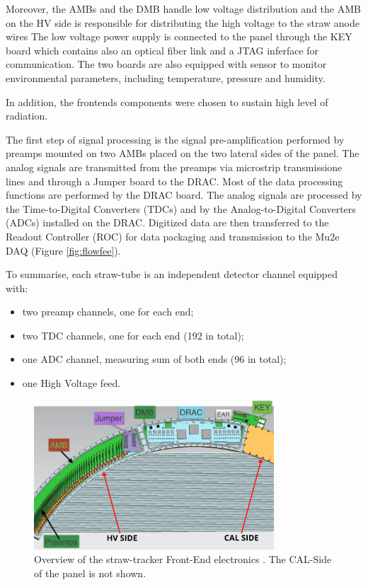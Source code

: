 Moreover, the AMBs and the DMB handle 
low voltage distribution and the AMB on the HV side is responsible for 
distributing the high voltage to the straw anode wires
The low voltage power supply is connected to the panel through the KEY board which 
contains also an optical fiber link and a JTAG inferface for communication.
The two boards are also equipped with sensor to monitor environmental parameters, 
including temperature, pressure and humidity.

In addition, the frontends components were chosen to sustain high level of radiation.

The first step of signal processing is the signal pre-amplification performed 
by preamps mounted on two AMBs placed on the two lateral sides of the panel. 
The analog signals are transmitted from the preamps via 
microstrip transmissione lines and through a Jumper board to the DRAC.
Most of the data processing functions are performed by the DRAC board. 
The analog signals are processed by the Time-to-Digital Converters 
(TDCs) and by the Analog-to-Digital Converters 
(ADCs) installed on the DRAC. Digitized data are then transferred to the Readout 
Controller (ROC) for data packaging and transmission to the Mu2e DAQ 
(Figure \ref{fig:flowfee}). 

To summarise, each straw-tube is an independent detector channel equipped with:
\begin{itemize}
    \item two preamp channels, one for each end;
    \item two TDC channels, one for each end (192 in total);
    \item one ADC channel, measuring sum of both ends (96 in total);
    \item one High Voltage feed.
\end{itemize}
\begin{figure}[!h]
\centering
\includegraphics[width =0.8\textwidth]{figures/png/Screenshot_20240131_111836.png}
\caption[Overview of the straw-tracker Front-End electronics.]{Overview of the straw-tracker Front-End electronics  
\cite{vadimmu2e}. The CAL-Side of the panel is not shown.}
\label{fig:trackerfee}
\end{figure}


